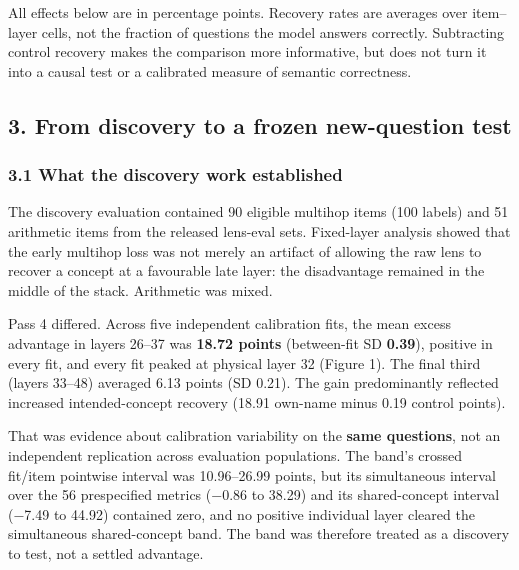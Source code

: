 \documentclass[
  british,
  11pt,
  a4paper,
]{article}
\begin{document}
All effects below are in percentage points. Recovery rates are averages
over item--layer cells, not the fraction of questions the model answers
correctly. Subtracting control recovery makes the comparison more
informative, but does not turn it into a causal test or a calibrated
measure of semantic correctness.

\subsection{3. From discovery to a frozen new-question
test}\label{from-discovery-to-a-frozen-new-question-test}

\subsubsection{3.1 What the discovery work
established}\label{what-the-discovery-work-established}

The discovery evaluation contained 90 eligible multihop items (100
labels) and 51 arithmetic items from the released lens-eval sets.
Fixed-layer analysis showed that the early multihop loss was not merely
an artifact of allowing the raw lens to recover a concept at a
favourable late layer: the disadvantage remained in the middle of the
stack. Arithmetic was mixed.

Pass 4 differed. Across five independent calibration fits, the mean
excess advantage in layers 26--37 was \textbf{18.72 points} (between-fit
SD \textbf{0.39}), positive in every fit, and every fit peaked at
physical layer 32 (Figure 1). The final third (layers 33--48) averaged
6.13 points (SD 0.21). The gain predominantly reflected increased
intended-concept recovery (18.91 own-name minus 0.19 control points).

That was evidence about calibration variability on the \textbf{same
questions}, not an independent replication across evaluation
populations. The band's crossed fit/item pointwise interval was
10.96--26.99 points, but its simultaneous interval over the 56
prespecified metrics (−0.86 to 38.29) and its shared-concept interval
(−7.49 to 44.92) contained zero, and no positive individual layer
cleared the simultaneous shared-concept band. The band was therefore
treated as a discovery to test, not a settled advantage.
\end{document}
